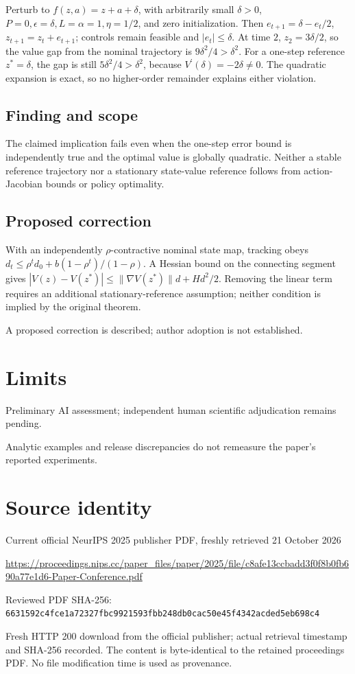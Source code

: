 \documentclass[11pt]{article}
\begin{document}
Perturb to \(f(z,a)=z+a+\delta\), with arbitrarily small \(\delta>0\), \(P=0,\epsilon=\delta,L=\alpha=1,\eta=1/2\), and zero initialization. Then \(e_{t+1}=\delta-e_t/2\), \(z_{t+1}=z_t+e_{t+1}\); controls remain feasible and \(|e_t|\le\delta\). At time \(2\), \(z_2=3\delta/2\), so the value gap from the nominal trajectory is \(9\delta^2/4>\delta^2\). For a one-step reference \(z^*=\delta\), the gap is still \(5\delta^2/4>\delta^2\), because \(V^{\prime}(\delta)=-2\delta\ne0\). The quadratic expansion is exact, so no higher-order remainder explains either violation.

\subsection*{Finding and scope}

The claimed implication fails even when the one-step error bound is independently true and the optimal value is globally quadratic. Neither a stable reference trajectory nor a stationary state-value reference follows from action-Jacobian bounds or policy optimality.

\subsection*{Proposed correction}

With an independently \(\rho\)-contractive nominal state map, tracking obeys \(d_t\le\rho^td_0+b(1-\rho^t)/(1-\rho)\). A Hessian bound on the connecting segment gives \(|V(z)-V(z^*)|\le\|\nabla V(z^*)\|d+Hd^2/2\). Removing the linear term requires an additional stationary-reference assumption; neither condition is implied by the original theorem.

A proposed correction is described; author adoption is not established.

\section*{Limits}

Preliminary AI assessment; independent human scientific adjudication remains pending.\par

Analytic examples and release discrepancies do not remeasure the paper’s reported experiments.\par

\section*{Source identity}

Current official NeurIPS 2025 publisher PDF, freshly retrieved 21 October 2026

\url{https://proceedings.nips.cc/paper_files/paper/2025/file/c8afe13ccbadd3f0f8b0fb690a77e1d6-Paper-Conference.pdf}

Reviewed PDF SHA-256: \nolinkurl{6631592c4fce1a72327fbc9921593fbb248db0cac50e45f4342acded5eb698c4}

Fresh HTTP 200 download from the official publisher; actual retrieval timestamp and SHA-256 recorded. The content is byte-identical to the retained proceedings PDF. No file modification time is used as provenance.
\end{document}
